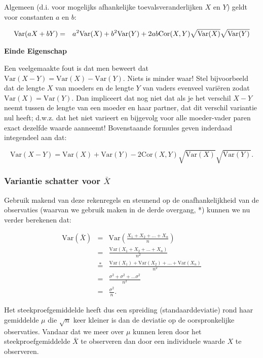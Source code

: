 \documentclass[
  12pt,dutch]{book}
\theoremstyle{definition}
\theoremstyle{definition}
\theoremstyle{definition}
\theoremstyle{definition}
\theoremstyle{remark}
\begin{document}
Algemeen (d.i. voor mogelijks afhankelijke toevalsveranderlijken \(X\) en \(Y\)) geldt voor constanten \(a\) en \(b\):

\begin{eqnarray*}
\text{Var}(aX+bY) &=& a^2 \text{Var}(X) + b^2 \text{Var}(Y) + 2 ab {%
\text{Cor}}(X,Y)\sqrt{\text{Var}(X)}\sqrt{\text{Var}(Y)}
\end{eqnarray*}

\textbf{Einde Eigenschap}

Een veelgemaakte fout is dat men beweert dat \(\text{Var}(X-Y)=\text{Var}(X)-\text{Var}(Y)\). Niets is minder waar! Stel bijvoorbeeld dat de lengte \(X\) van moeders en de lengte \(Y\) van vaders evenveel variëren zodat \(\text{Var}(X)=\text{Var}(Y)\). Dan impliceert dat nog niet dat als je het verschil \(X-Y\) neemt tussen de lengte van een moeder en haar partner, dat dit verschil variantie nul heeft; d.w.z. dat het niet varieert en bijgevolg voor alle
moeder-vader paren exact dezelfde waarde aanneemt! Bovenstaande formules
geven inderdaad integendeel aan dat:

\begin{equation*}
\text{Var}(X-Y) = \text{Var}(X) + \text{Var}(Y) -2{\text{Cor}}(X,Y)\sqrt{\text{Var}(X)}\sqrt{\text{Var}(Y)}.
\end{equation*}

\subsubsection{\texorpdfstring{Variantie schatter voor \(\bar X\)}{Variantie schatter voor \textbackslash bar X}}\label{variantie-schatter-voor-bar-x}

Gebruik makend van deze rekenregels en steunend
op de onafhankelijkheid van de observaties (waarvan we gebruik maken in de
derde overgang, *) kunnen we nu verder berekenen dat:

\begin{eqnarray*}
\text{Var}(\bar X)&=&\text{Var} \left(\frac{X_1+ X_2+ ... + X_n}{n}\right) \\
&= & \frac{\text{Var} (X_1+ X_2+ ... + X_n)}{n^2} \\
&\overset{*}{=} & \frac{\text{Var}(X_1)+ \text{Var}(X_2)+ ... + \text{Var}(X_n)}{n^2} \\
&=& \frac{\sigma^2 + \sigma^2 + ... \sigma^2}{n^2} \\
&= & \frac{\sigma^2}{n}.
\end{eqnarray*}

Het steekproefgemiddelde heeft dus een spreiding (standaarddeviatie) rond
haar gemiddelde \(\mu\) die \(\sqrt{n}\) keer kleiner is dan de deviatie op de
oorspronkelijke observaties. Vandaar dat we meer over \(\mu\) kunnen leren
door het steekproefgemiddelde \(\bar X\) te observeren dan door een
individuele waarde \(X\) te observeren.
\end{document}
